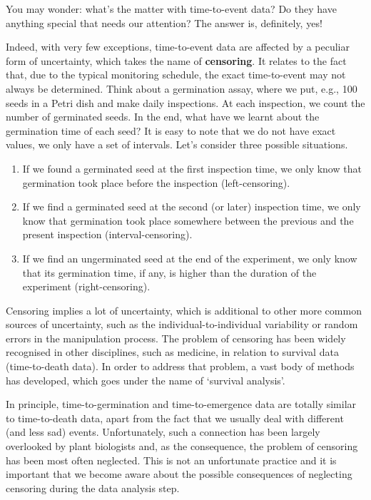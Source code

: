 \documentclass[
]{book}
\providecommand{\tightlist}{%
  \setlength{\itemsep}{0pt}\setlength{\parskip}{0pt}}
\begin{document}
You may wonder: what's the matter with time-to-event data? Do they have anything special that needs our attention? The answer is, definitely, yes!

Indeed, with very few exceptions, time-to-event data are affected by a peculiar form of uncertainty, which takes the name of \textbf{censoring}. It relates to the fact that, due to the typical monitoring schedule, the exact time-to-event may not always be determined. Think about a germination assay, where we put, e.g., 100 seeds in a Petri dish and make daily inspections. At each inspection, we count the number of germinated seeds. In the end, what have we learnt about the germination time of each seed? It is easy to note that we do not have exact values, we only have a set of intervals. Let's consider three possible situations.

\begin{enumerate}
\def\labelenumi{\arabic{enumi}.}
\tightlist
\item
  If we found a germinated seed at the first inspection time, we only know that germination took place before the inspection (left-censoring).
\item
  If we find a germinated seed at the second (or later) inspection time, we only know that germination took place somewhere between the previous and the present inspection (interval-censoring).
\item
  If we find an ungerminated seed at the end of the experiment, we only know that its germination time, if any, is higher than the duration of the experiment (right-censoring).
\end{enumerate}

Censoring implies a lot of uncertainty, which is additional to other more common sources of uncertainty, such as the individual-to-individual variability or random errors in the manipulation process. The problem of censoring has been widely recognised in other disciplines, such as medicine, in relation to survival data (time-to-death data). In order to address that problem, a vast body of methods has developed, which goes under the name of `survival analysis'.

In principle, time-to-germination and time-to-emergence data are totally similar to time-to-death data, apart from the fact that we usually deal with different (and less sad) events. Unfortunately, such a connection has been largely overlooked by plant biologists and, as the consequence, the problem of censoring has been most often neglected. This is not an unfortunate practice and it is important that we become aware about the possible consequences of neglecting censoring during the data analysis step.
\end{document}
